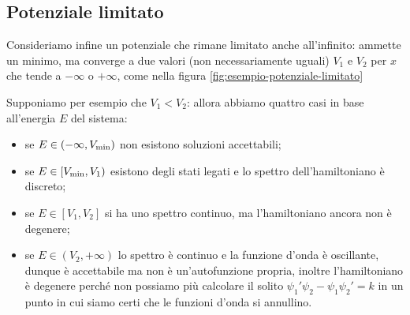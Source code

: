 \subsection{Potenziale limitato}
Consideriamo infine un potenziale che rimane limitato anche all'infinito: ammette un minimo, ma converge a due valori (non necessariamente uguali) $V_1$ e $V_2$ per $x$ che tende a $-\infty$ o $+\infty$, come nella figura \ref{fig:esempio-potenziale-limitato}

Supponiamo per esempio che $V_1<V_2$: allora abbiamo quattro casi in base all'energia $E$ del sistema:
\begin{itemize}
	\item se $E\in(-\infty,V_\textup{min})$ non esistono soluzioni accettabili;
	\item se $E\in[V_\textup{min},V_1)$ esistono degli stati legati e lo spettro dell'hamiltoniano è discreto;
	\item se $E\in[V_1,V_2]$ si ha uno spettro continuo, ma l'hamiltoniano ancora non è degenere;
	\item se $E\in(V_2,+\infty)$ lo spettro è continuo e la funzione d'onda è oscillante, dunque è accettabile ma non è un'autofunzione propria, inoltre l'hamiltoniano è degenere perch\'e non possiamo più calcolare il solito $\psi_1'\psi_2-\psi_1\psi_2'=k$ in un punto in cui siamo certi che le funzioni d'onda si annullino.
\end{itemize}

